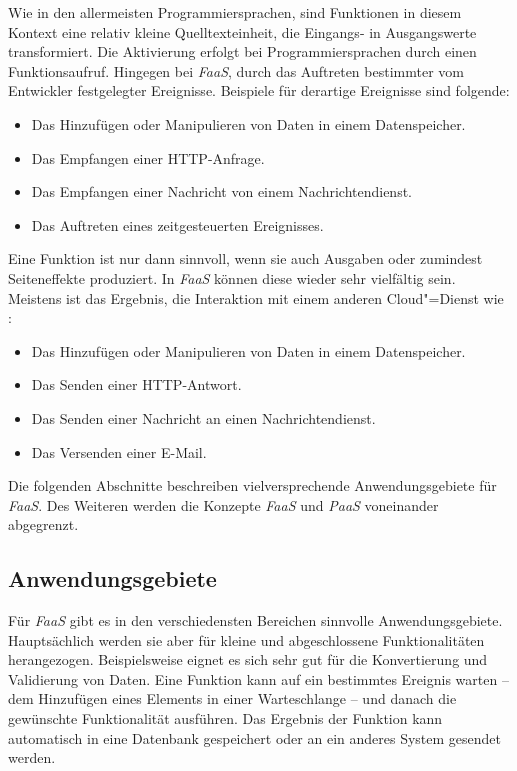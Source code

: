 Wie in den allermeisten Programmiersprachen, sind Funktionen in diesem Kontext eine relativ kleine Quelltexteinheit, die Eingangs- in Ausgangswerte transformiert. Die Aktivierung erfolgt bei Programmiersprachen durch einen Funktionsaufruf. Hingegen bei \textit{FaaS}, durch das Auftreten bestimmter vom Entwickler festgelegter Ereignisse. Beispiele für derartige Ereignisse sind folgende:

\begin{itemize}
	\item Das Hinzufügen oder Manipulieren von Daten in einem Datenspeicher.
	\item Das Empfangen einer HTTP-Anfrage.
	\item Das Empfangen einer Nachricht von einem Nachrichtendienst.
	\item Das Auftreten eines zeitgesteuerten Ereignisses.
\end{itemize}

Eine Funktion ist nur dann sinnvoll, wenn sie auch Ausgaben oder zumindest Seiteneffekte produziert. In \textit{FaaS} können diese wieder sehr vielfältig sein. Meistens ist das Ergebnis, die Interaktion mit einem anderen Cloud"=Dienst wie \zB:

\begin{itemize}
	\item Das Hinzufügen oder Manipulieren von Daten in einem Datenspeicher.
	\item Das Senden einer HTTP-Antwort.
	\item Das Senden einer Nachricht an einen Nachrichtendienst.
	\item Das Versenden einer E-Mail.
\end{itemize}

Die folgenden Abschnitte beschreiben vielversprechende Anwendungsgebiete für \textit{FaaS}. Des Weiteren werden die Konzepte \textit{FaaS} und \textit{PaaS} voneinander abgegrenzt.

\subsection{Anwendungsgebiete}

Für \textit{FaaS} gibt es in den verschiedensten Bereichen sinnvolle Anwendungsgebiete. Hauptsächlich werden sie aber für kleine und abgeschlossene Funktionalitäten herangezogen. Beispielsweise eignet es sich sehr gut für die Konvertierung und Validierung von Daten. Eine Funktion kann auf ein bestimmtes Ereignis warten -- \zB dem Hinzufügen eines Elements in einer Warteschlange -- und danach die gewünschte Funktionalität ausführen. Das Ergebnis der Funktion kann \zB automatisch in eine Datenbank gespeichert oder an ein anderes System gesendet werden.


